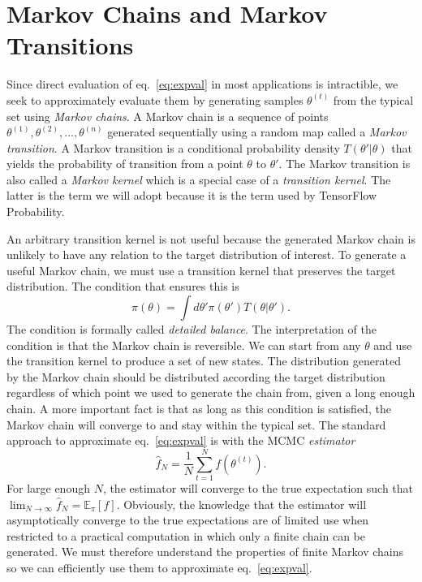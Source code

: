 \section{Markov Chains and Markov Transitions}
Since direct evaluation of eq.~\eqref{eq:expval} in most applications is intractible, we seek to approximately evaluate them
by generating samples $\theta^{(t)}$ from the typical set using \textit{Markov chains}. A Markov chain is a sequence of points $\theta^{(1)}, \theta^{(2)}, ..., \theta^{(n)}$ generated sequentially
using a random map called a \textit{Markov transition}. A Markov transition is a conditional probability density
$T(\theta'|\theta)$ that yields the probability of transition from a point $\theta$ to $\theta'$. The Markov transition is also called
a \textit{Markov kernel} which is a special case of a \textit{transition kernel}. The latter is the term we will adopt because it
is the term used by TensorFlow Probability.

An arbitrary transition kernel is not useful because the generated Markov chain is unlikely to have any relation to the target distribution
of interest. To generate a useful Markov chain, we must use a transition kernel that preserves the target distribution. 
The condition that ensures this is
\begin{equation}\label{eq:detailed_balance}
    \pi(\theta) = \int d\theta' \pi(\theta')T(\theta|\theta').
\end{equation}
The condition is formally called \textit{detailed balance}. The interpretation of the condition is that the Markov chain is reversible.
We can start from any $\theta$ and use the transition kernel to produce a set of new states. The distribution generated by the Markov chain
should be distributed according the target distribution regardless of which point we used to generate the chain from, given a long enough chain. A more important
fact is that as long as this condition is satisfied, the Markov chain will converge to and stay within the typical set.
The standard approach to approximate eq.~\eqref{eq:expval} is with the MCMC \textit{estimator}
\begin{equation}
    \hat{f}_N = \frac{1}{N}\sum_{t=1}^N f(\theta^{(t)}).
\end{equation}
For large enough $N$, the estimator will converge to the true expectation such that $\lim_{N\to\infty} \hat{f}_N = \mathbb{E}_\pi[f]$.
Obviously, the knowledge that the estimator will asymptotically converge to the true expectations are of limited use
when restricted to a practical computation in which only a finite chain can be generated. 
We must therefore understand the properties of finite Markov chains so we can efficiently use them to approximate eq.~\eqref{eq:expval}.

